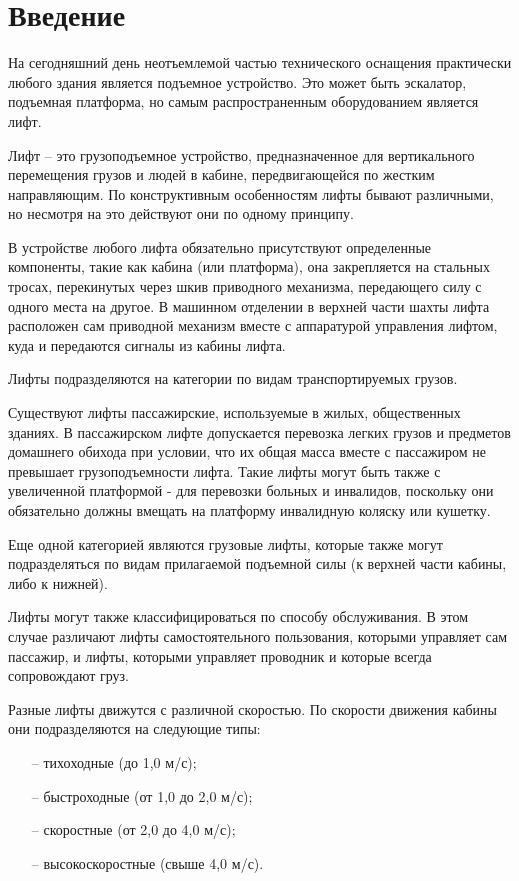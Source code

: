 \chapter*{Введение}
	На сегодняшний день неотъемлемой частью технического оснащения практически любого здания
		является подъемное устройство. Это может быть эскалатор, подъемная платформа,
		но самым распространенным оборудованием является лифт.

	Лифт -- это грузоподъемное устройство, предназначенное для вертикального перемещения
		грузов и людей в кабине, передвигающейся по жестким направляющим.
		По конструктивным особенностям лифты бывают различными, но несмотря на это действуют они по одному принципу.

	В устройстве любого лифта обязательно присутствуют определенные компоненты,
		такие как кабина (или платформа), она закрепляется на стальных тросах,
		перекинутых через шкив приводного механизма, передающего силу с одного места на другое.
		В машинном отделении в верхней части шахты лифта расположен сам приводной механизм
		вместе с аппаратурой управления лифтом, куда и передаются сигналы из кабины лифта. 

	Лифты подразделяются на категории по видам транспортируемых грузов.

	Существуют лифты пассажирские, используемые в жилых, общественных зданиях.
		В пассажирском лифте допускается перевозка легких грузов и предметов домашнего обихода при условии,
		что их общая масса вместе с пассажиром не превышает грузоподъемности лифта.
		Такие лифты могут быть также с увеличенной платформой - для перевозки больных и инвалидов,
		поскольку они обязательно должны вмещать на платформу инвалидную коляску или кушетку.

	Еще одной категорией являются грузовые лифты, которые также могут подразделяться
		по видам прилагаемой подъемной силы (к верхней части кабины, либо к нижней).

	Лифты могут также классифицироваться по способу обслуживания.
		В этом случае различают лифты самостоятельного пользования,
		которыми управляет сам пассажир, и лифты, которыми управляет проводник и которые всегда сопровождают груз.

	Разные лифты движутся с различной скоростью. По скорости движения кабины они подразделяются на следующие типы:
		\begin{itemize}
			\item[--] тихо­ходные (до 1,0 м/с);
			\item[--] быстроходные (от 1,0 до 2,0 м/с);
			\item[--] скоростные (от 2,0 до 4,0 м/с);
			\item[--] высокоскоростные (свыше 4,0 м/с).
		\end{itemize}

